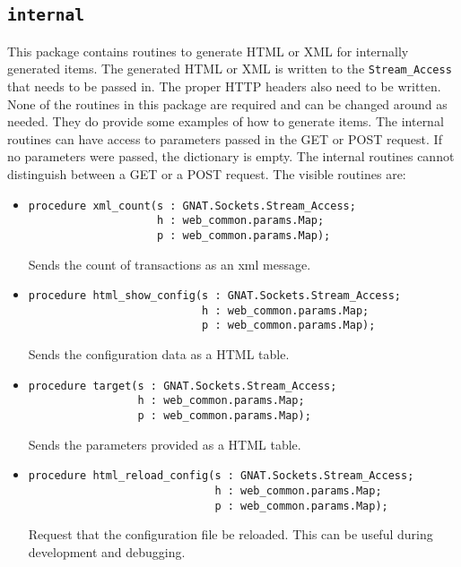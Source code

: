 \documentclass[10pt, openany, draft]{article}
\begin{document}
\subsection{\texttt{internal}}
This package contains routines to generate HTML or XML for internally generated items.  The generated HTML or XML is written to the \texttt{Stream\_Access} that needs to be passed in.  The proper HTTP headers also need to be written.  None of the routines in this package are required and can be changed around as needed.  They do provide some examples of how to generate items.  The internal routines can have access to parameters passed in the GET or POST request.  If no parameters were passed, the dictionary is empty.  The internal routines cannot distinguish between a GET or a POST request.  The visible routines are:
\begin{itemize}
  \item \begin{verbatim}
procedure xml_count(s : GNAT.Sockets.Stream_Access;
                    h : web_common.params.Map;
                    p : web_common.params.Map);
\end{verbatim}
  Sends the count of transactions as an xml message.
  \item \begin{verbatim}
procedure html_show_config(s : GNAT.Sockets.Stream_Access;
                           h : web_common.params.Map;
                           p : web_common.params.Map);
\end{verbatim}
  Sends the configuration data as a HTML table.
  \item \begin{verbatim}
procedure target(s : GNAT.Sockets.Stream_Access;
                 h : web_common.params.Map;
                 p : web_common.params.Map);
\end{verbatim}
  Sends the parameters provided as a HTML table.
  \item \begin{verbatim}
procedure html_reload_config(s : GNAT.Sockets.Stream_Access;
                             h : web_common.params.Map;
                             p : web_common.params.Map);
\end{verbatim}
  Request that the configuration file be reloaded.  This can be useful during development and debugging.
\end{itemize}
\end{document}
